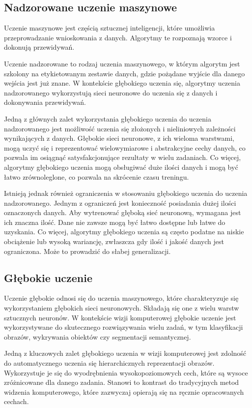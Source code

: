 \subsection{Nadzorowane uczenie maszynowe}

Uczenie maszynowe jest częścią sztucznej inteligencji, które umożliwia przeprowadzanie wnioskowania z danych. Algorytmy te rozpoznają wzorce i dokonują przewidywań.

Uczenie nadzorowane to rodzaj uczenia maszynowego, w którym algorytm jest szkolony na etykietowanym zestawie danych, gdzie pożądane wyjście dla danego wejścia jest już znane. W kontekście głębokiego uczenia się, algorytmy uczenia nadzorowanego wykorzystują sieci neuronowe do uczenia się z danych i dokonywania przewidywań.

Jedną z głównych zalet wykorzystania głębokiego uczenia do uczenia nadzorowanego jest możliwość uczenia się złożonych i nieliniowych zależności wynikających z danych. Głębokie sieci neuronowe, z ich wieloma warstwami, mogą uczyć się i reprezentować wielowymiarowe i abstrakcyjne cechy danych, co pozwala im osiągnąć satysfakcjonujące rezultaty w wielu zadaniach. Co więcej, algorytmy głębokiego uczenia mogą obsługiwać duże ilości danych i mogą być łatwo zrównoleglone, co pozwala na skrócenie czasu treningu.


Istnieją jednak również ograniczenia w stosowaniu głębokiego uczenia do uczenia nadzorowanego. Jednym z ograniczeń jest konieczność posiadania dużej ilości oznaczonych danych. Aby wytrenować głęboką sieć neuronową, wymagana jest ich znaczna ilość. Dane nie zawsze mogą być łatwo dostępne lub łatwe do uzyskania. Co więcej, algorytmy głębokiego uczenia są często podatne na niskie obciążenie lub wysoką wariancję, zwłaszcza gdy ilość i jakość danych jest ograniczona. Może to prowadzić do słabej generalizacji.
\subsection{Głębokie uczenie}
Uczenie głębokie odnosi się do uczenia maszynowego, które charakteryzuje się wykorzystaniem głębokich sieci neuronowych. Składają się one z wielu warstw sztucznych neuronów. W kontekście wizji komputerowej głębokie uczenie jest wykorzystywane do skutecznego rozwiązywania wielu zadań, w tym klasyfikacji obrazów, wykrywania obiektów czy segmentacji semantycznej.

Jedną z kluczowych zalet głębokiego uczenia w wizji komputerowej jest zdolność do automatycznego uczenia się hierarchicznych reprezentacji obrazów. Wykorzystuje je się do wyodrębnienia wysokopoziomowych cech, które są wysoce zróżnicowane dla danego zadania. Stanowi to kontrast do tradycyjnych metod widzenia komputerowego, które zazwyczaj opierają się na ręcznie opracowanych cechach.

